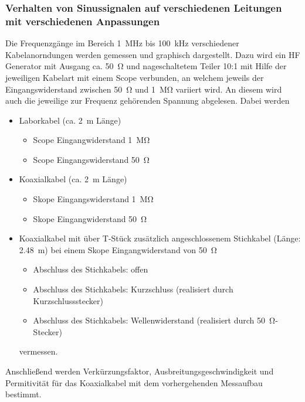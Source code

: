 \documentclass[a4paper,twoside,final]{article}
\begin{document}
\subsubsection{Verhalten von Sinussignalen auf verschiedenen Leitungen mit verschiedenen Anpassungen}
Die Frequenzgänge im Bereich \SI{1}{\mega\hertz} bis \SI{100}{\kilo\hertz} verschiedener Kabelanorndungen werden gemessen und graphisch dargestellt. Dazu wird ein HF Generator mit Ausgang ca. \SI{50}{\ohm} und nageschaltetem Teiler 10:1 mit Hilfe der jeweiligen Kabelart mit einem Scope verbunden, an welchem jeweils der Eingangswiderstand zwischen \SI{50}{\ohm}  und \SI{1}{\mega\ohm} variiert wird. An diesem wird auch die jeweilige zur Frequenz gehörenden Spannung abgelesen.  Dabei werden
\begin{itemize}
  \item Laborkabel (ca. \SI{2}{\meter} Länge)
  \begin{itemize}
    \item Scope Eingangwiderstand \SI{1}{\mega\ohm}
    \item Scope Eingangswiderstand \SI{50}{\ohm}
  \end{itemize}
  \item{Koaxialkabel (ca. \SI{2}{\meter} Länge)}
  \begin{itemize}
    \item Skope Eingangswiderstand \SI{1}{\mega\ohm}
    \item Skope Eingangwiderstand \SI{50}{\ohm}
  \end{itemize}
  \item Koaxialkabel mit über T-Stück zusätzlich angeschlossenem Stichkabel (Länge: \SI{2,48}{\meter}) bei einem Skope Eingangwiderstand von \SI{50}{\ohm}
  \begin{itemize}
    \item Abschluss des Stichkabels: offen
    \item Abschluss des Stichkabels: Kurzschluss (realisiert durch Kurzschlussstecker)
    \item Abschluss des Stichkabels: Wellenwiderstand (realisiert durch \SI{50}{\ohm}- Stecker)
  \end{itemize}
  vermessen.
\end{itemize}

Anschließend werden Verkürzungsfaktor, Ausbreitungsgeschwindigkeit und Permitivität für das Koaxialkabel mit dem vorhergehenden Messaufbau bestimmt.
\end{document}
